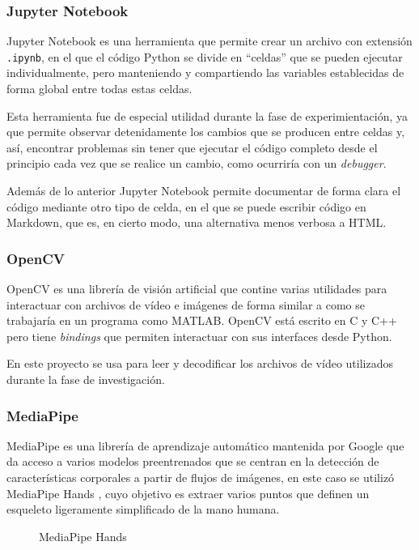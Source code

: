 \subsubsection{Jupyter Notebook}

Jupyter Notebook es una herramienta que permite crear un archivo con extensión
\texttt{.ipynb}, en el que el código Python se divide en ``celdas'' que se
pueden ejecutar individualmente, pero manteniendo y compartiendo las variables
establecidas de forma global entre todas estas celdas.

Esta herramienta fue de especial utilidad durante la fase de experimientación,
ya que permite observar detenidamente los cambios que se producen entre celdas
y, así, encontrar problemas sin tener que ejecutar el código completo desde el
principio cada vez que se realice un cambio, como ocurriría con un
\textit{debugger}.

Además de lo anterior Jupyter Notebook permite documentar de forma clara el
código mediante otro tipo de celda, en el que se puede escribir código en
Markdown, que es, en cierto modo, una alternativa menos verbosa a HTML.

\subsubsection{OpenCV}

OpenCV es una librería de visión artificial que contine varias utilidades para
interactuar con archivos de vídeo e imágenes de forma similar a como se
trabajaría en un programa como MATLAB\@. OpenCV está escrito en C y C++ pero tiene
\textit{bindings} que permiten interactuar con sus interfaces desde Python.

En este proyecto se usa para leer y decodificar los archivos de vídeo utilizados
durante la fase de investigación.

\subsubsection{MediaPipe}

MediaPipe es una librería de aprendizaje automático mantenida por Google que da
acceso a varios modelos preentrenados que se centran en la detección de
características corporales a partir de flujos de imágenes, en este caso se
utilizó MediaPipe Hands \cite{zhang2020mediapipe}, cuyo objetivo es extraer
varios puntos que definen un esqueleto ligeramente simplificado de la mano
humana.

\begin{figure}[H]
      \centering
      \caption{MediaPipe Hands}
\end{figure}

